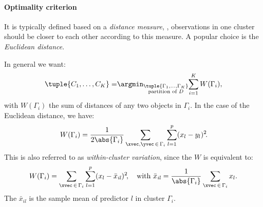 \paragraph{Optimality criterion}

It is typically defined based on a \emph{distance measure}, \ie, observations in one cluster should be closer to each other according to this measure. A popular choice is the \emph{Euclidean distance}.

In general we want:
\begin{equation}
    \tuple{C_1, \ldots, C_K} = \negthickspace\argmin_{\substack{\tuple{\Gamma_1, \ldots, \Gamma_K} \\ \text{partition of } D}}\negmedspace\sum_{i=1}^K W(\Gamma_i),
\end{equation}
with $W(\Gamma_i)$ the sum of distances of any two objects in $\Gamma_i$. In the case of the Euclidean distance, we have:
\begin{equation}\label{eq:within_cluster_variation}
    W(\Gamma_i) = \frac{1}{2\abs{\Gamma_i}} \sum_{\xvec, \yvec\,\in\,\Gamma_i} \sum_{l = 1}^p (x_l - y_l)^2\negthinspace.
\end{equation}
This is also referred to as \emph{within-cluster variation}, since the $W$ is equivalent to:
\begin{equation}
    W(\Gamma_i) = \sum_{\xvec\,\in\,\Gamma_i} \sum_{l = 1}^p (x_l - \bar{x}_{\mathit{il}})^2\negthinspace, \quad \text{with } \bar{x}_{\mathit{il}} = \frac{1}{\abs{\Gamma_i}} \sum_{\xvec\,\in\,\Gamma_i} x_l.
\end{equation}
The $\bar{x}_{\mathit{il}}$ is the sample mean of predictor $l$ in cluster $\Gamma_i$.

